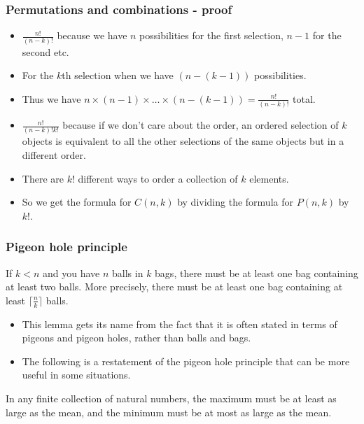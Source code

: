 \documentclass[handout]{beamer}
\begin{document}
\begin{frame}
\frametitle{Permutations and combinations - proof}
\begin{itemize}
\item $\frac{n!}{(n-k)!}$ because we have $n$ possibilities for the first selection, $n-1$ for the second etc. 
\item For the $k$th selection when we have $(n-(k-1))$ possibilities. 
\item Thus we have $n\times (n-1)\times\ldots\times (n-(k-1)) = \frac{n!}{(n-k)!}$ total.\vspace{0.5cm}

\item $\frac{n!}{(n-k)! k!}$ because if we don't care about the order, an ordered selection of $k$ objects is equivalent to all the other selections of the same objects but in a different order. 
\item There are $k!$ different ways to order a collection of $k$ elements. 
\item So we get the formula for $C(n,k)$ by dividing the formula for $P(n,k)$ by $k!$.  
\end{itemize}
\end{frame}

\begin{frame}
\frametitle{Pigeon hole principle}
\begin{lemma}
If $k < n$ and you have $n$ balls in $k$ bags, there must be at least one bag containing at least two balls. More precisely, there must be at least one bag containing at least $\lceil \frac{n}{k}\rceil$ balls.
\end{lemma}
\begin{itemize}
\item This lemma gets its name from the fact that it is often stated in terms of pigeons and pigeon holes, rather than balls and bags. 
\item The following is a restatement of the pigeon hole principle that can be more useful in some situations.
\end{itemize}
\begin{lemma}\label{L:Dij}
In any finite collection of natural numbers, the maximum must be at least as large as the mean, and the minimum must be at most as large as the mean.
\end{lemma}
\end{frame}
\end{document}
